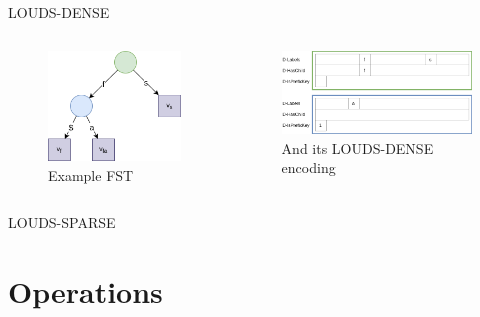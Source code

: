 \documentclass{beamer}
\begin{document}
\begin{frame}{LOUDS-DENSE}
		\begin{columns}
				\begin{figure}
						\centering
						\includegraphics[width=\textwidth]{resources/louds_trie}
						\caption{Example FST}
				\end{figure}
				\begin{figure}
						\centering
						\includegraphics[width=\textwidth]{resources/louds_dense}
						\caption{And its LOUDS-DENSE encoding}
				\end{figure}
		\end{columns}
\end{frame}

\begin{frame}{LOUDS-SPARSE}
\end{frame}

\section{Operations}
\end{document}
